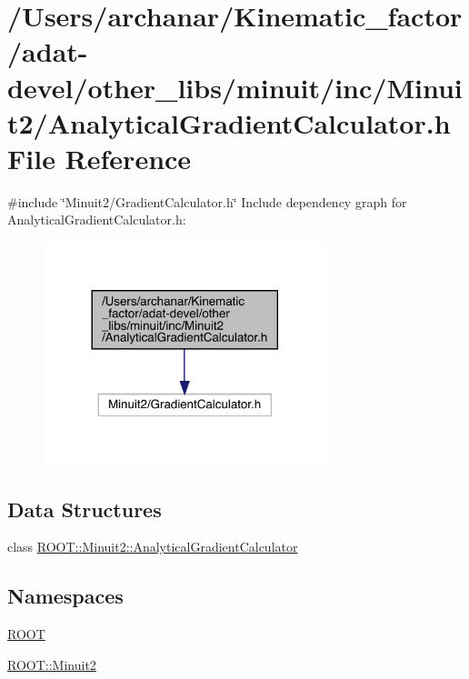 \hypertarget{adat-devel_2other__libs_2minuit_2inc_2Minuit2_2AnalyticalGradientCalculator_8h}{}\section{/\+Users/archanar/\+Kinematic\+\_\+factor/adat-\/devel/other\+\_\+libs/minuit/inc/\+Minuit2/\+Analytical\+Gradient\+Calculator.h File Reference}
\label{adat-devel_2other__libs_2minuit_2inc_2Minuit2_2AnalyticalGradientCalculator_8h}
{\ttfamily \#include \char`\"{}Minuit2/\+Gradient\+Calculator.\+h\char`\"{}}\newline
Include dependency graph for Analytical\+Gradient\+Calculator.\+h\+:
\nopagebreak
\begin{figure}[H]
\begin{center}
\leavevmode
\includegraphics[width=233pt]{dc/df1/adat-devel_2other__libs_2minuit_2inc_2Minuit2_2AnalyticalGradientCalculator_8h__incl}
\end{center}
\end{figure}
\subsection*{Data Structures}
\begin{DoxyCompactItemize}
\item 
class \mbox{\hyperlink{classROOT_1_1Minuit2_1_1AnalyticalGradientCalculator}{R\+O\+O\+T\+::\+Minuit2\+::\+Analytical\+Gradient\+Calculator}}
\end{DoxyCompactItemize}
\subsection*{Namespaces}
\begin{DoxyCompactItemize}
\item 
 \mbox{\hyperlink{namespaceROOT}{R\+O\+OT}}
\item 
 \mbox{\hyperlink{namespaceROOT_1_1Minuit2}{R\+O\+O\+T\+::\+Minuit2}}
\end{DoxyCompactItemize}
